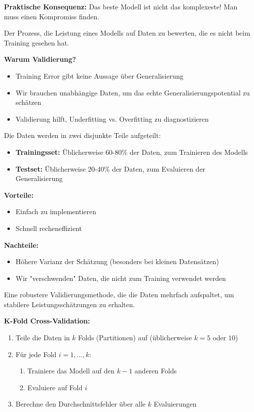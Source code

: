 \textbf{Praktische Konsequenz:} Das beste Modell ist nicht das komplexeste! Man muss einen Kompromiss finden.

Der Prozess, die Leistung eines Modells auf Daten zu bewerten, die es nicht beim Training gesehen hat.

\textbf{Warum Validierung?}
\begin{itemize}[leftmargin=1.5em]
    \item Training Error gibt keine Aussage über Generalisierung
    \item Wir brauchen unabhängige Daten, um das echte Generalisierungspotential zu schätzen
    \item Validierung hilft, Underfitting vs. Overfitting zu diagnostizieren
\end{itemize}

Die Daten werden in zwei disjunkte Teile aufgeteilt:
\begin{itemize}[leftmargin=1.5em]
    \item \textbf{Trainingsset:} Üblicherweise 60-80\% der Daten, zum Trainieren des Modells
    \item \textbf{Testset:} Üblicherweise 20-40\% der Daten, zum Evaluieren der Generalisierung
\end{itemize}

\textbf{Vorteile:}
\begin{itemize}[leftmargin=1.5em]
    \item Einfach zu implementieren
    \item Schnell recheneffizient
\end{itemize}

\textbf{Nachteile:}
\begin{itemize}[leftmargin=1.5em]
    \item Höhere Varianz der Schätzung (besonders bei kleinen Datensätzen)
    \item Wir "verschwenden" Daten, die nicht zum Training verwendet werden
\end{itemize}

Eine robustere Validierungsmethode, die die Daten mehrfach aufspaltet, um stabilere Leistungsschätzungen zu erhalten.

\textbf{K-Fold Cross-Validation:}
\begin{enumerate}[leftmargin=1.5em]
    \item Teile die Daten in $k$ Folds (Partitionen) auf (üblicherweise $k = 5$ oder $10$)
    \item Für jede Fold $i = 1, \ldots, k$:
    \begin{enumerate}[leftmargin=1.5em]
        \item Trainiere das Modell auf den $k-1$ anderen Folds
        \item Evaluiere auf Fold $i$
    \end{enumerate}
    \item Berechne den Durchschnittsfehler über alle $k$ Evaluierungen
\end{enumerate}

